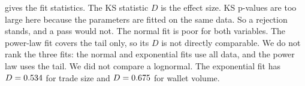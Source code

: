  gives the fit statistics.
The KS statistic $D$ is the effect size.
KS p-values are too large here because the parameters are fitted on the same data.
So a rejection stands, and a pass would not.
The normal fit is poor for both variables.
The power-law fit covers the tail only, so its $D$ is not directly comparable.
We do not rank the three fits: the normal and exponential fits use all data, and the power law uses the tail.
We did not compare a lognormal.
The exponential fit has $D=0.534$ for trade size and $D=0.675$ for wallet volume.


